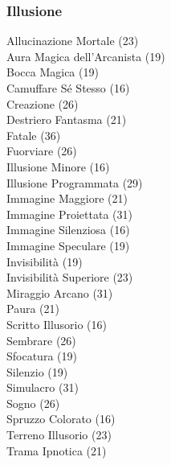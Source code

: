 \begin{multicols}{3}
	\subsubsection{Illusione}	
	Allucinazione Mortale (23)\\
	Aura Magica dell'Arcanista (19)\\
	Bocca Magica (19)\\
	Camuffare Sé Stesso (16)\\
	Creazione (26)\\
	Destriero Fantasma (21)\\
	Fatale (36)\\
	Fuorviare (26)\\
	Illusione Minore (16)\\
	Illusione Programmata (29)\\
	Immagine Maggiore (21)\\
	Immagine Proiettata (31)\\
	Immagine Silenziosa (16)\\
	Immagine Speculare (19)\\
	Invisibilità (19)\\
	Invisibilità Superiore (23)\\
	Miraggio Arcano (31)\\
	Paura (21)\\
	Scritto Illusorio (16)\\
	Sembrare (26)\\
	Sfocatura (19)\\
	Silenzio (19)\\
	Simulacro (31)\\
	Sogno (26)\\
	Spruzzo Colorato (16)\\
	Terreno Illusorio (23)\\
	Trama Ipnotica (21)\\
	

\end{multicols}
